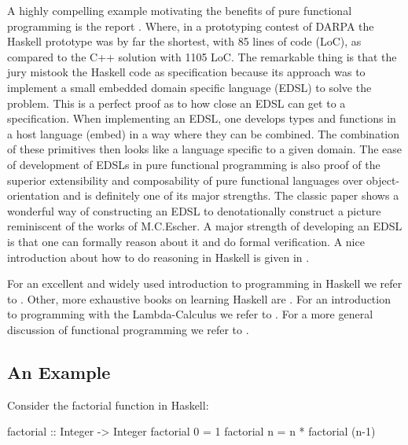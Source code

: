 A highly compelling example motivating the benefits of pure functional programming is the report \cite{hudak_haskell_1994}. Where, in a prototyping contest of DARPA the Haskell prototype was by far the shortest, with 85 lines of code (LoC), as compared to the C++ solution with 1105 LoC. The remarkable thing is that the jury mistook the Haskell code as specification because its approach was to implement a small embedded domain specific language (EDSL) to solve the problem. This is a perfect proof as to how close an EDSL can get to a specification. When implementing an EDSL, one develops types and functions in a host language (embed) in a way where they can be combined. The combination of these primitives then looks like a language specific to a given domain. The ease of development of EDSLs in pure functional programming is also proof of the superior extensibility and composability of pure functional languages over object-orientation and is definitely one of its major strengths. The classic paper \cite{henderson_functional_1982} shows a wonderful way of constructing an EDSL to denotationally construct a picture reminiscent of the works of M.C.Escher. A major strength of developing an EDSL is that one can formally reason about it and do formal verification. A nice introduction about how to do reasoning in Haskell is given in \cite{hutton_tutorial_1999}.

For an excellent and widely used introduction to programming in Haskell we refer to \cite{hutton_programming_2016}. Other, more exhaustive books on learning Haskell are \cite{allen_haskell_2016, lipovaca_learn_2011}. For an introduction to programming with the Lambda-Calculus we refer to \cite{michaelson_introduction_2011}. For a more general discussion of functional programming we refer to \cite{hughes_why_1989,maclennan_functional_1990}.

\subsection{An Example}
Consider the factorial function in Haskell:
\begin{HaskellCode}
factorial :: Integer -> Integer
factorial 0 = 1
factorial n = n * factorial (n-1)
\end{HaskellCode}

